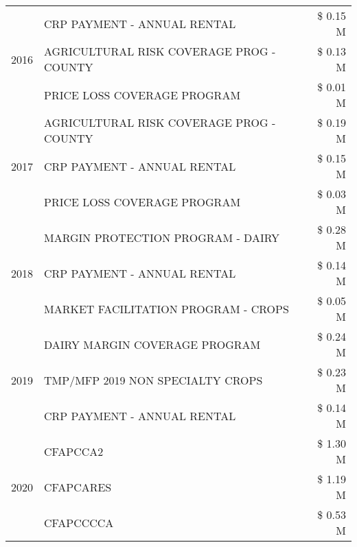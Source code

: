 \begin{tabular}{llr}
\cline{1-3}
\multirow[t]{3}{*}{2016} & CRP PAYMENT - ANNUAL RENTAL & \$ 0.15 M \\
 & AGRICULTURAL RISK COVERAGE PROG - COUNTY & \$ 0.13 M \\
 & PRICE LOSS COVERAGE PROGRAM & \$ 0.01 M \\
\cline{1-3}
\multirow[t]{3}{*}{2017} & AGRICULTURAL RISK COVERAGE PROG - COUNTY & \$ 0.19 M \\
 & CRP PAYMENT - ANNUAL RENTAL & \$ 0.15 M \\
 & PRICE LOSS COVERAGE PROGRAM & \$ 0.03 M \\
\cline{1-3}
\multirow[t]{3}{*}{2018} & MARGIN PROTECTION PROGRAM - DAIRY & \$ 0.28 M \\
 & CRP PAYMENT - ANNUAL RENTAL & \$ 0.14 M \\
 & MARKET FACILITATION PROGRAM - CROPS & \$ 0.05 M \\
\cline{1-3}
\multirow[t]{3}{*}{2019} & DAIRY MARGIN COVERAGE PROGRAM & \$ 0.24 M \\
 & TMP/MFP 2019 NON SPECIALTY CROPS & \$ 0.23 M \\
 & CRP PAYMENT - ANNUAL RENTAL & \$ 0.14 M \\
\cline{1-3}
\multirow[t]{3}{*}{2020} & CFAPCCA2 & \$ 1.30 M \\
 & CFAPCARES & \$ 1.19 M \\
 & CFAPCCCCA & \$ 0.53 M \\
\cline{1-3}
\bottomrule
\end{tabular}
